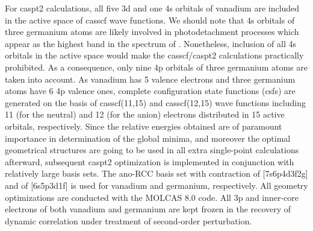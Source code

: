 \begin{refsection}
For \acrshort{caspt2} calculations, all five 3d and one 4s orbitals of vanadium are included in the active space of \acrshort{casscf} wave functions. We should note that 4s orbitals of three germanium atoms are likely involved in photodetachment processes which appear as the highest band in the spectrum of . Nonetheless, inclusion of all 4s orbitals in the active space would make the \acrshort{casscf}/\acrshort{caspt2} calculations practically prohibited. As a consequence, only nine 4p orbitals of three germanium atoms are taken into account. As vanadium has 5 valence electrons and three germanium atoms have 6 4p valence ones, complete configuration state functions (\acrshort{csf}s) are generated on the basis of \acrshort{casscf}(11,15) and \acrshort{casscf}(12,15) wave functions including 11 (for the neutral) and 12 (for the anion) electrons distributed in 15 active orbitals, respectively. Since the relative energies obtained are of paramount importance in determination of the global minima, and moreover the optimal geometrical structures are going to be used in all extra single-point calculations afterward, subsequent \acrshort{caspt2} optimization is implemented in conjunction with relatively large basis sets. The \acrshort{ano}-RCC basis set with contraction of [7s6p4d3f2g] \cite{c5:19} and of [6s5p3d1f] \cite{c5:20} is used for vanadium and germanium, respectively. All geometry optimizations are conducted with the MOLCAS 8.0 code. \cite{c5:21} All 3p and inner-core electrons of both vanadium and germanium are kept frozen in the recovery of dynamic correlation under treatment of second-order perturbation.






\end{refsection}
